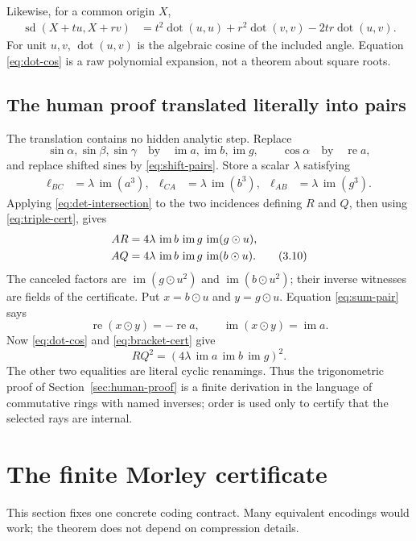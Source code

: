 \documentclass[11pt]{article}
\theoremstyle{definition}
\newcommand{\rotmul}{\mathbin{\odot}}
\newcommand{\sqdist}{\operatorname{sd}}
\newcommand{\im}{\operatorname{im}}
\newcommand{\re}{\operatorname{re}}
\newcommand{\dotp}{\operatorname{dot}}
\begin{document}
Likewise, for a common origin $X$,
\begin{align}
\sqdist(X+tu,X+rv)
 &=t^2\dotp(u,u)+r^2\dotp(v,v)-2tr\dotp(u,v).
 \tag{3.8}\label{eq:dot-cos}
\end{align}
For unit $u,v$, $\dotp(u,v)$ is the algebraic cosine of the included angle.
Equation \eqref{eq:dot-cos} is a raw polynomial expansion, not a theorem about
square roots.

\subsection{The human proof translated literally into pairs}
The translation contains no hidden analytic step.  Replace
\[
 \sin\alpha,\sin\beta,\sin\gamma
   \quad\text{by}\quad \im a,\im b,\im g,
 \qquad
 \cos\alpha\quad\text{by}\quad\re a,
\]
and replace shifted sines by \eqref{eq:shift-pairs}.  Store a scalar
$\lambda$ satisfying
\begin{align}
 \ell_{BC}&=\lambda\,\im(a^3),&
 \ell_{CA}&=\lambda\,\im(b^3),&
 \ell_{AB}&=\lambda\,\im(g^3).
 \tag{3.9}\label{eq:lambda-pair}
\end{align}
Applying \eqref{eq:det-intersection} to the two incidences defining $R$ and
$Q$, then using \eqref{eq:triple-cert}, gives
\begin{align}
 AR&=4\lambda\,\im b\,\im g\,\im(g\rotmul u),\notag\\
 AQ&=4\lambda\,\im b\,\im g\,\im(b\rotmul u).
 \tag{3.10}\label{eq:pair-lengths}
\end{align}
The canceled factors are $\im(g\rotmul u^2)$ and
$\im(b\rotmul u^2)$; their inverse witnesses are fields of the certificate.
Put $x=b\rotmul u$ and $y=g\rotmul u$.  Equation
\eqref{eq:sum-pair} says
\[
 \re(x\rotmul y)=-\re a,
 \qquad \im(x\rotmul y)=\im a.
\]
Now \eqref{eq:dot-cos} and \eqref{eq:bracket-cert} give
\[
 RQ^2=(4\lambda\,\im a\,\im b\,\im g)^2.
\]
The other two equalities are literal cyclic renamings.  Thus the
trigonometric proof of Section~\ref{sec:human-proof} is a finite derivation in
the language of commutative rings with named inverses; order is used only to
certify that the selected rays are internal.

\section{The finite Morley certificate}
\label{sec:certificate}

This section fixes one concrete coding contract.  Many equivalent encodings
would work; the theorem does not depend on compression details.
\end{document}
